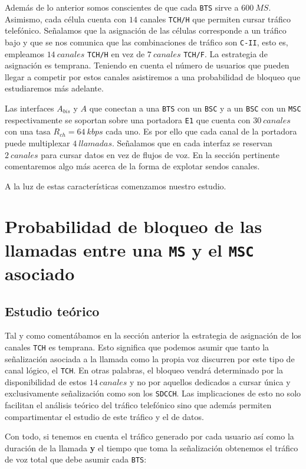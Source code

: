 \documentclass[10pt]{article}
\begin{document}
			Además de lo anterior somos conscientes de que cada \texttt{BTS} sirve a $600\ MS$. Asimismo, cada célula cuenta con $14$ canales \texttt{TCH/H} que permiten cursar tráfico telefónico. Señalamos que la asignación de las células corresponde a un tráfico bajo y que se nos comunica que las combinaciones de tráfico son \texttt{C-II}, esto es, empleamos $14\ canales$ \texttt{TCH/H} en vez de $7\ canales$ \texttt{TCH/F}. La estrategia de asignación es temprana. Teniendo en cuenta el número de usuarios que pueden llegar a competir por estos canales asistiremos a una probabilidad de bloqueo que estudiaremos más adelante.

			Las interfaces $A_{bis}$ y $A$ que conectan a una \texttt{BTS} con un \texttt{BSC} y a un \texttt{BSC} con un \texttt{MSC} respectivamente se soportan sobre una portadora \texttt{E1} que cuenta con $30\ canales$ con una tasa $R_{ch} = 64\ kbps$ cada uno. Es por ello que cada canal de la portadora puede multiplexar $4\ llamadas$. Señalamos que en cada interfaz se reservan $2\ canales$ para cursar datos en vez de flujos de voz. En la sección pertinente comentaremos algo más acerca de la forma de explotar sendos canales.

			A la luz de estas características comenzamos nuestro estudio.

	\section{Probabilidad de bloqueo de las llamadas entre una \texttt{MS} y el \texttt{MSC} asociado}
		\subsection{Estudio teórico}
			Tal y como comentábamos en la sección anterior la estrategia de asignación de los canales \texttt{TCH} es temprana. Esto significa que podemos asumir que tanto la señalización asociada a la llamada como la propia voz discurren por este tipo de canal lógico, el \texttt{TCH}. En otras palabras, el bloqueo vendrá determinado por la disponibilidad de estos $14\ canales$ y no por aquellos dedicados a cursar única y exclusivamente señalización como son los \texttt{SDCCH}. Las implicaciones de esto no solo facilitan el análisis teórico del tráfico telefónico sino que además permiten compartimentar el estudio de este tráfico y el de datos.

			Con todo, si tenemos en cuenta el tráfico generado por cada usuario así como la duración de la llamada \textbf{y} el tiempo que toma la señalización obtenemos el tráfico de voz total que debe asumir cada \texttt{BTS}:
\end{document}

